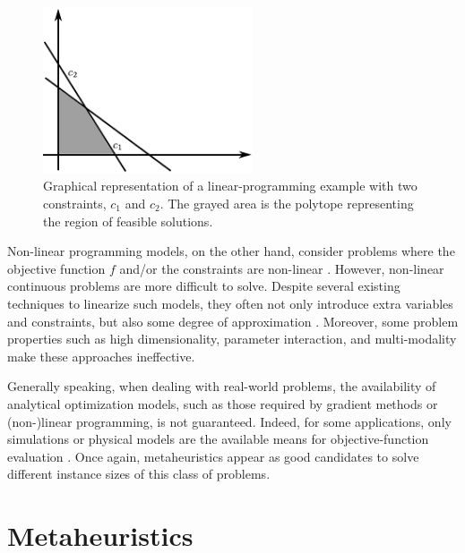 \begin{figure}
\centering

\includegraphics[width=0.55\textwidth]{02-background_and_motivation/img/linear_programming}

\caption{Graphical representation of a linear-programming example with two
constraints, $c_{1}$ and $c_{2}$. The grayed area is the polytope
representing the region of feasible solutions. \label{fig:02-linear_programming_example}}
\end{figure}


Non-linear programming models, on the other hand, consider problems
where the objective function $f$ and/or the constraints are non-linear
\cite{Bazaraa-Nonlinear_programming:2006}. However, non-linear continuous
problems are more difficult to solve. Despite several existing techniques
to linearize such models, they often not only introduce extra variables
and constraints, but also some degree of approximation \cite{Glover-Improved_linear_programming_formulations_for_nonlinear_problems:1975}.
Moreover, some problem properties such as high dimensionality, parameter
interaction, and multi-modality make these approaches ineffective.

\bigskip{}


Generally speaking, when dealing with real-world problems, the availability
of analytical optimization models, such as those required by gradient
methods or (non-)linear programming, is not guaranteed. Indeed, for
some applications, only simulations or physical models are the available
means for objective-function evaluation \cite{Fu-Optimization_for_simulation:2002}.
Once again, metaheuristics appear as good candidates to solve different
instance sizes of this class of problems. 


\section{Metaheuristics \label{sec:02-Metaheuristics}}

